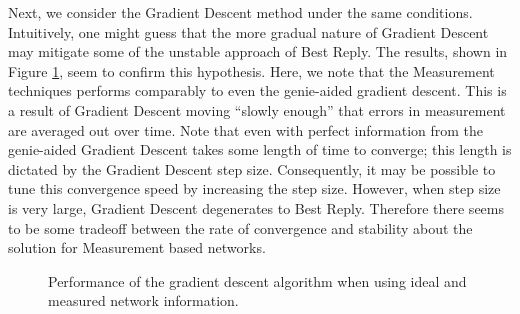 \documentclass[11pt]{IEEEtran}
\theoremstyle{definition}
\begin{document}
Next, we consider the Gradient Descent method under the same conditions. Intuitively, one might guess that the more gradual nature of Gradient Descent may mitigate some of the unstable approach of Best Reply. The results, shown in Figure \ref{fig:graddesc}, seem to confirm this hypothesis.  Here, we note that the Measurement techniques performs comparably to even the genie-aided gradient descent. This is a result of Gradient Descent moving ``slowly enough'' that errors in measurement are averaged out over time.  Note that even with perfect information from the genie-aided Gradient Descent takes some length of time to converge; this length is dictated by the Gradient Descent step size. Consequently, it may be possible to tune this convergence speed by increasing the step size. However, when step size is very large, Gradient Descent degenerates to Best Reply. Therefore there seems to be some tradeoff between the rate of convergence and stability about the solution for Measurement based networks.

\begin{figure}[tp]
\begin{center}
  \caption{Performance of the gradient descent algorithm when using ideal and
  measured network information.}
  \label{fig:graddesc}
\end{center}
\end{figure}
\end{document}
